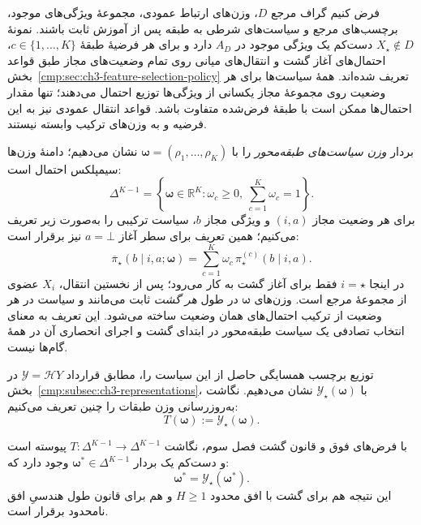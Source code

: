 فرض کنیم گراف مرجع $D$، وزن‌های ارتباط عمودی، مجموعهٔ ویژگی‌های موجود،
برچسب‌های مرجع و سیاست‌های شرطی به طبقه پس از آموزش ثابت باشند.
نمونهٔ $X_\star\notin D$ دست‌کم یک ویژگی موجود در $A_D$ دارد و برای
هر فرضیهٔ طبقهٔ $c\in\{1,\ldots,K\}$، احتمال‌های آغاز گشت و انتقال‌های
میانی روی تمام وضعیت‌های مجاز طبق قواعد بخش~\ref{cmp:sec:ch3-feature-selection-policy}
تعریف شده‌اند. همهٔ سیاست‌ها برای هر وضعیت روی مجموعهٔ مجاز یکسانی
از ویژگی‌ها توزیع احتمال می‌دهند؛ تنها مقدار احتمال‌ها ممکن است
با طبقهٔ فرض‌شده متفاوت باشد. قواعد انتقال عمودی نیز به این فرضیه
و به وزن‌های ترکیب وابسته نیستند.

بردار \emph{وزن سیاست‌های طبقه‌محور} را با
$\boldsymbol{\omega}=(\rho_1,\ldots,\rho_K)$ نشان می‌دهیم؛
دامنهٔ وزن‌ها سیمپلکس احتمال است:
\begin{equation}\label{eq:app-ch3-adaptive-policy-simplex}
\Delta^{K-1}
=\left\{\boldsymbol{\omega}\in\mathbb R^K:
\omega_c\ge0,\ \sum_{c=1}^{K}\omega_c=1\right\}.
\end{equation}
برای هر وضعیت مجاز $(i,a)$ و ویژگی مجاز $b$، سیاست ترکیبی را
به‌صورت زیر تعریف می‌کنیم؛ همین تعریف برای سطر آغاز
$a=\bot$ نیز برقرار است:
\begin{equation}\label{eq:app-ch3-adaptive-policy-mixture}
\boxed{
\overline\pi_\star(b\mid i,a;\boldsymbol{\omega})
=\sum_{c=1}^{K}\omega_c\,\pi_\star^{(c)}(b\mid i,a).
}
\end{equation}
در اینجا $i=\star$ فقط برای آغاز گشت به کار می‌رود؛
پس از نخستین انتقال، $X_i$ عضوی از مجموعهٔ مرجع است.
وزن‌های $\boldsymbol{\omega}$ در طول \emph{هر گشت} ثابت می‌مانند
و سیاست در هر وضعیت از ترکیب احتمال‌های همان وضعیت ساخته می‌شود.
این تعریف به معنای انتخاب تصادفی یک سیاست طبقه‌محور در ابتدای گشت
و اجرای انحصاری آن در همهٔ گام‌ها نیست.

توزیع برچسب همسایگی حاصل از این سیاست را، مطابق قرارداد
$\mathscr Y=\mathscr H Y$ در
بخش~\ref{cmp:subsec:ch3-representations}،
با $\mathscr Y_\star(\boldsymbol{\omega})$ نشان می‌دهیم.
نگاشت به‌روزرسانی وزن طبقات را چنین تعریف می‌کنیم:
\begin{equation}\label{eq:app-ch3-adaptive-policy-map}
T(\boldsymbol{\omega})
:=\mathscr Y_\star(\boldsymbol{\omega}).
\end{equation}

\begin{proposition}\label{prop:app-ch3-adaptive-policy-fixed-point}
با فرض‌های فوق و قانون گشت فصل سوم، نگاشت
$T:\Delta^{K-1}\longrightarrow\Delta^{K-1}$
پیوسته است و دست‌کم یک بردار
$\boldsymbol{\omega}^{\ast}\in\Delta^{K-1}$ وجود دارد که:
\begin{equation}\label{eq:app-ch3-adaptive-policy-fixed-point}
\boxed{
\boldsymbol{\omega}^{\ast}
=\mathscr Y_\star(\boldsymbol{\omega}^{\ast}).
}
\end{equation}
این نتیجه هم برای گشت با افق محدود $H\ge1$
و هم برای قانون طول هندسیِ افق نامحدود برقرار است.
\end{proposition}

